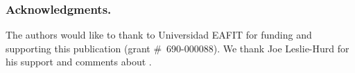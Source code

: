 \documentclass[../main.tex]{subfiles}
\begin{document}

\subsubsection*{Acknowledgments.}

The authors would like to thank to Universidad EAFIT for funding and supporting
this publication (grant \#~690-000088). We thank Joe Leslie-Hurd for his support
and comments about \Metis.
\end{document}

